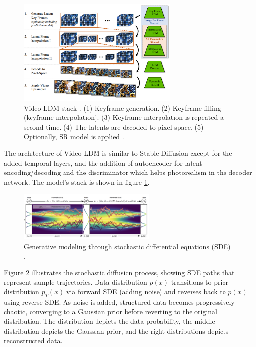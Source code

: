 \begin{figure}
    \centering
    \includegraphics[width=0.7\textwidth]{images/video_ldm/stack.png}
    \caption{Video-LDM stack \cite{video_ldm}. (1) Keyframe generation. (2) Keyframe filling (keyframe interpolation). (3) Keyframe interpolation is repeated a second time. (4) The latents are decoded to pixel space. (5) Optionally, SR model is applied \cite{video_ldm}.}
    \label{fig:video_ldm_stack}
\end{figure}

The architecture of Video-LDM is similar to Stable Diffusion except for the added temporal layers, and the addition of autoencoder for latent encoding/decoding and the discriminator which helps photorealism in the decoder network. The model's stack is shown in figure \ref{fig:video_ldm_stack}.

\begin{figure}
    \centering
    \includegraphics[width=0.6\textwidth]{images/video_ldm/ddpm_sde.png}
    \caption{Generative modeling through stochastic differential equations (SDE) \cite{song2020score}.}
    \label{fig:video_ldm_ode}
\end{figure}

Figure \ref{fig:video_ldm_ode} illustrates the stochastic diffusion process, showing SDE paths that represent sample trajectories. Data distribution $p(x)$ transitions to prior distribution $p_T(x)$ via forward SDE (adding noise) and reverses back to $p(x)$ using reverse SDE. As noise is added, structured data becomes progressively chaotic, converging to a Gaussian prior before reverting to the original distribution. The distribution depicts the data probability, the middle distribution depicts the Gaussian prior, and the right distributions depicts reconstructed data.


